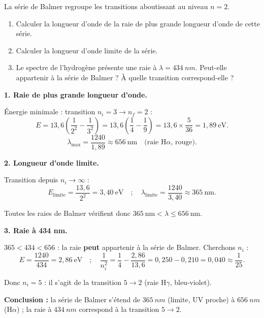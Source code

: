 \documentclass[11pt]{article}
\begin{document}
\begin{exoresolu}
La série de Balmer regroupe les transitions aboutissant au niveau $n=2$.
\begin{enumerate}
\item Calculer la longueur d'onde de la raie de plus grande longueur d'onde de cette série.
\item Calculer la longueur d'onde limite de la série.
\item Le spectre de l'hydrogène présente une raie à $\lambda = \SI{434}{nm}$. Peut-elle appartenir à la série de Balmer ? À quelle transition correspond-elle ?
\end{enumerate}
\tcblower
\textbf{1. Raie de plus grande longueur d'onde.}

Énergie minimale : transition $n_i = 3 \to n_f = 2$ :
\[
E = 13{,}6\left(\frac{1}{2^2} - \frac{1}{3^2}\right) = 13{,}6\left(\frac{1}{4} - \frac{1}{9}\right) = 13{,}6\times\frac{5}{36} = 1{,}89~\text{eV}.
\]
\[
\lambda_{\max} = \frac{1240}{1{,}89} \approx 656~\text{nm} \quad \text{(raie H}\alpha\text{, rouge)}.
\]

\textbf{2. Longueur d'onde limite.}

Transition depuis $n_i \to \infty$ :
\[
E_{\text{limite}} = \frac{13{,}6}{2^2} = 3{,}40~\text{eV} \quad ; \quad \lambda_{\text{limite}} = \frac{1240}{3{,}40} \approx 365~\text{nm}.
\]

Toutes les raies de Balmer vérifient donc $365~\text{nm} < \lambda \leq 656~\text{nm}$.

\textbf{3. Raie à 434 nm.}

$365 < 434 < 656$ : la raie \textbf{peut} appartenir à la série de Balmer. Cherchons $n_i$ :
\[
E = \frac{1240}{434} = 2{,}86~\text{eV} \quad ; \quad \frac{1}{n_i^2} = \frac{1}{4} - \frac{2{,}86}{13{,}6} = 0{,}250 - 0{,}210 = 0{,}040 \approx \frac{1}{25}.
\]

Donc $n_i = 5$ : il s'agit de la transition $5 \to 2$ (raie H$\gamma$, bleu-violet).

\textbf{Conclusion :} la série de Balmer s'étend de $\SI{365}{nm}$ (limite, UV proche) à $\SI{656}{nm}$ (H$\alpha$) ; la raie à $\SI{434}{nm}$ correspond à la transition $5 \to 2$.
\end{exoresolu}
\end{document}
